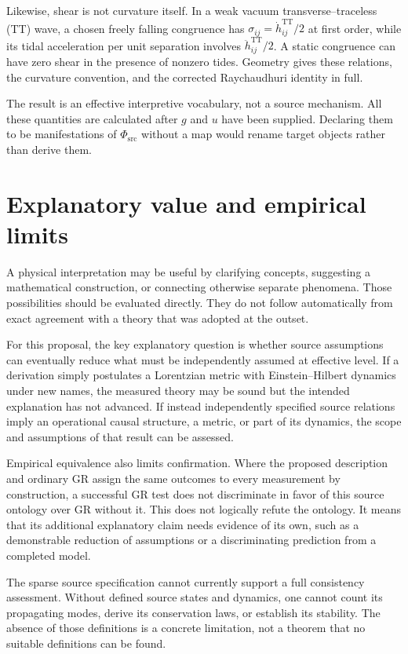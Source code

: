 \documentclass[11pt,oneside]{report}
\newcommand{\PhiSrc}{\Phi_{\mathrm{src}}}
\newcommand{\TT}{\mathrm{TT}}
\theoremstyle{remark}
\numberwithin{definition}{chapter}
\numberwithin{proposition}{chapter}
\numberwithin{remark}{chapter}
\begin{document}
Likewise, shear is not curvature itself. In a weak vacuum transverse--traceless (TT) wave, a chosen freely falling congruence has $\sigma_{ij}=\dot h^{\TT}_{ij}/2$ at first order, while its tidal acceleration per unit separation involves $\ddot h^{\TT}_{ij}/2$. A static congruence can have zero shear in the presence of nonzero tides. Geometry gives these relations, the curvature convention, and the corrected Raychaudhuri identity in full.

The result is an effective interpretive vocabulary, not a source mechanism. All these quantities are calculated after $g$ and $u$ have been supplied. Declaring them to be manifestations of $\PhiSrc$ without a map would rename target objects rather than derive them.

\section{Explanatory value and empirical limits}
A physical interpretation may be useful by clarifying concepts, suggesting a mathematical construction, or connecting otherwise separate phenomena. Those possibilities should be evaluated directly. They do not follow automatically from exact agreement with a theory that was adopted at the outset.

For this proposal, the key explanatory question is whether source assumptions can eventually reduce what must be independently assumed at effective level. If a derivation simply postulates a Lorentzian metric with Einstein--Hilbert dynamics under new names, the measured theory may be sound but the intended explanation has not advanced. If instead independently specified source relations imply an operational causal structure, a metric, or part of its dynamics, the scope and assumptions of that result can be assessed.

Empirical equivalence also limits confirmation. Where the proposed description and ordinary GR assign the same outcomes to every measurement by construction, a successful GR test does not discriminate in favor of this source ontology over GR without it. This does not logically refute the ontology. It means that its additional explanatory claim needs evidence of its own, such as a demonstrable reduction of assumptions or a discriminating prediction from a completed model.

The sparse source specification cannot currently support a full consistency assessment. Without defined source states and dynamics, one cannot count its propagating modes, derive its conservation laws, or establish its stability. The absence of those definitions is a concrete limitation, not a theorem that no suitable definitions can be found.
\end{document}
